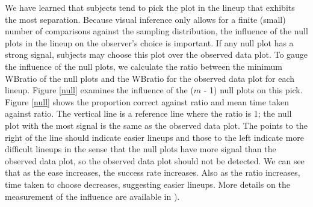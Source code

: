 We have learned that subjects tend to pick the plot in the lineup that exhibits the most separation.  Because visual inference only allows for a finite (small) number of comparisons against the sampling distribution, the influence of the null plots in the lineup on the observer's choice is important. If any null plot has a strong signal, subjects may choose this plot over the observed data plot. To gauge the influence of the null plots, we calculate the ratio between the minimum WBratio of the null plots and the WBratio for the observed data plot for each lineup. Figure \ref{null} examines the influence of the ($m$ - 1) null plots on this pick. Figure \ref{null} shows the proportion correct against ratio and mean time taken against ratio. The vertical line is a reference line where the ratio is 1; the null plot with the most signal is the same as the observed data plot. The points to the right of the line should indicate easier lineups and those to the left indicate more difficult lineups in the sense that the null plots have more signal than the observed data plot, so the observed data plot should not be detected. We can see that as the ease increases, the success rate increases. Also as the ratio increases, time taken to choose decreases, suggesting easier lineups. More details on the measurement of the influence are available in \cite{roychowdhury:2012}).


